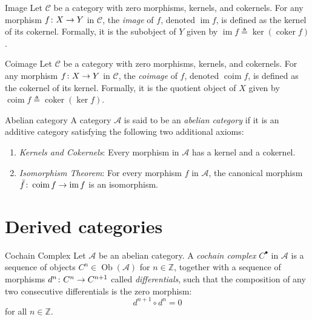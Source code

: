 \documentclass[a4paper]{article}
\begin{document}
\begin{snippetdefinition}{Image}
    Let \(\mathcal C\) be a category with zero morphisms, kernels, and cokernels.
    For any morphism \(f \colon X \to Y\) in \(\mathcal C\), the \emph{image} of \(f\), denoted \(\operatorname{im} f\), is defined as the kernel of its cokernel.
    Formally, it is the subobject of \(Y\) given by \(\operatorname{im} f \triangleq \ker(\operatorname{coker} f)\).
\end{snippetdefinition}

\begin{snippetdefinition}{Coimage}
    Let \(\mathcal C\) be a category with zero morphisms, kernels, and cokernels.
    For any morphism \(f \colon X \to Y\) in \(\mathcal C\), the \emph{coimage} of \(f\), denoted \(\operatorname{coim} f\), is defined as the cokernel of its kernel.
    Formally, it is the quotient object of \(X\) given by \(\operatorname{coim} f \triangleq \operatorname{coker}(\ker f)\).
\end{snippetdefinition}

\begin{snippetdefinition}{Abelian category}
    A category \(\mathcal A\) is said to be an \emph{abelian category} if it is an additive category satisfying the following two additional axioms:
    \begin{enumerate}
        \item \emph{Kernels and Cokernels}: Every morphism in \(\mathcal A\) has a kernel and a cokernel.
        \item \emph{Isomorphism Theorem}: For every morphism \(f\) in \(\mathcal A\), the canonical morphism \(\bar{f} \colon \operatorname{coim} f \to \operatorname{im} f\) is an isomorphism.
    \end{enumerate}
\end{snippetdefinition}

\section{Derived categories}

\begin{snippetdefinition}{Cochain Complex}
    Let \(\mathcal A\) be an abelian category. A \emph{cochain complex} \(C^\bullet\) in \(\mathcal A\) is a sequence of objects \(C^n \in \operatorname{Ob}(\mathcal A)\) for \(n \in \mathbb{Z}\), together with a sequence of morphisms \(d^n \colon C^n \to C^{n+1}\) called \emph{differentials}, such that the composition of any two consecutive differentials is the zero morphism:
    \[
        d^{n+1} \circ d^n = 0
    \]
    for all \(n \in \mathbb{Z}\).
    \begin{center}
    \end{center}
\end{snippetdefinition}
\end{document}
